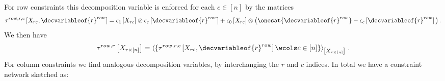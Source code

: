 \documentclass{scrartcl}
\begin{document}
{\begin{itemize}
            For row constraints this decomposition variable is enforced for each $c\in[n]$ by the matrices
            \begin{align*}
                \hypercoreofat{row,r,c}{\catvariableof{rc},\decvariableof{r}^{row}}
                = \tbasisat{\catvariableof{rc}} \otimes \onehotmapofat{c}{\decvariableof{r}^{row}}
                + \fbasisat{\catvariableof{rc}} \otimes \big(\onesat{\decvariableof{r}^{row}}-\onehotmapofat{c}{\decvariableof{r}^{row}}\big) \, .
            \end{align*}
            We then have
            \begin{align*}
                \hypercoreofat{row,r}{\catvariableof{r\times[n]}}
                = \contractionof{
                    \{\hypercoreofat{row,r,c}{\catvariableof{rc},\decvariableof{r}^{row}} \wcols c \in [n]\}
                }{\catvariableof{r\times[n]}} \, .
            \end{align*}
            For column constraints we find analogous decomposition variables, by interchanging the $r$ and $c$ indices.
            In total we have a constraint network sketched as:
\end{itemize}}
\end{document}
